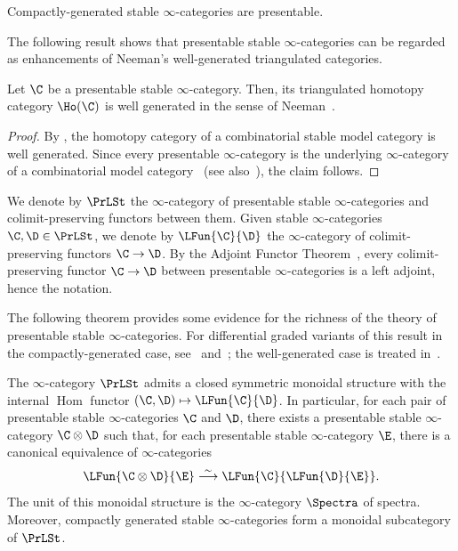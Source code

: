 \documentclass[a4paper]{amsart}
\begin{document}
\begin{remark}
  Compactly-generated stable $\infty$-categories are
  presentable.
\end{remark}

The following result  shows that presentable stable $\infty$-categories can be
regarded as enhancements of Neeman's well-generated triangulated categories.

\begin{theorem}
  Let $\C$ be a presentable stable $\infty$-category. Then, its triangulated
  homotopy category $\Ho(\C)$ is well generated in the sense of Neeman~\cite{Nee01}.
\end{theorem}
\begin{proof}
  By \cite[Proposition~6.10]{Ros05}, the homotopy category of a combinatorial
  stable model category is well generated. Since every presentable
  $\infty$-category is the underlying $\infty$-category of a combinatorial model
  category~\cite[Proposition~A.3.7.6]{Lur09} (see
  also~\cite[Proposition~1.3.4.22]{Lur17}), the claim follows.
\end{proof}

\begin{definition}
  We denote by $\PrLSt$ the $\infty$-category of presentable stable
  $\infty$-ca\-te\-go\-ries and colimit-preserving functors between them. Given stable $\infty$-categories
  $\C,\D\in\PrLSt$, we denote by $\LFun{\C}{\D}$ the $\infty$-category of
  colimit-preserving functors $\C\to\D$. By the Adjoint Functor
  Theorem~\cite[Corollary~5.5.2.9]{Lur09}, every colimit-preserving functor
  $\C\to\D$ between presentable $\infty$-categories is a left adjoint, hence the
  notation.
\end{definition}

The following theorem provides some evidence for the richness of the theory of
presentable stable $\infty$-categories. For differential graded variants of this
result in the compactly-generated case, see~\cite[Corollary 7.6]{Toe07}
and~\cite[Remark~2.23]{Jas25}; the well-generated case is treated
in~\cite{LRG22}.

\begin{theorem}
  \label{thm:PrLSt-tensor_product}
  The $\infty$-ca\-te\-go\-ry $\PrLSt$ admits a closed symmetric monoidal structure
  with the internal $\operatorname{Hom}$ functor $(\C,\D)\mapsto\LFun{\C}{\D}$.
  In particular, for each pair of presentable stable $\infty$-categories $\C$
  and $\D$, there exists a presentable stable $\infty$-category $\C\otimes\D$
  such that, for each presentable stable $\infty$-category $\E$, there is a
  canonical equivalence of $\infty$-categories
  \[
    \LFun{\C\otimes\D}{\E}\stackrel{\sim}{\longrightarrow}\LFun{\C}{\LFun{\D}{\E}}.
  \]
  The unit of this monoidal structure is the $\infty$-category $\Spectra$ of
  spectra. Moreover, compactly generated stable $\infty$-categories form a
  monoidal subcategory of $\PrLSt$.
\end{theorem}
\end{document}
